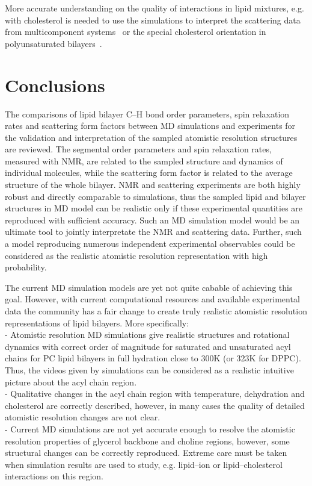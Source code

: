 \documentclass[aps,prl,superscriptaddress,twocolumn]{revtex4}
\begin{document}
More accurate understanding on the quality of interactions in lipid mixtures, e.g. with cholesterol is needed 
to use the simulations to interpret the scattering data from multicomponent systems~\cite{heftberger15} or the special
cholesterol orientation in polyunsaturated bilayers~\cite{harroun08,marrink08,kucerka10b}.



\section{Conclusions}

The comparisons of lipid bilayer C--H bond order parameters, spin relaxation rates and
scattering form factors between MD simulations and experiments for the validation and 
interpretation of the sampled atomistic resolution structures are reviewed.
The segmental order parameters and spin relaxation rates, measured with NMR, 
are related to the sampled structure and dynamics of individual molecules, while the
scattering form factor is related to the average structure of the whole bilayer.
NMR and scattering experiments are both highly robust and directly comparable to simulations, 
thus the sampled lipid and bilayer structures in MD model can be realistic only if these experimental 
quantities are reproduced with sufficient accuracy. Such an MD simulation model 
would be an ultimate tool to jointly interpretate the NMR and scattering data.
Further, such a model reproducing numerous independent experimental observables
could be  considered as the realistic atomistic resolution representation with high
probability. 

The current MD simulation models are yet not quite cabable of achieving this goal.
However, with current computational resources and available experimental
data the community has a fair change to create truly realistic atomistic resolution 
representations of lipid bilayers. More specifically: \\
- Atomistic resolution MD simulations give realistic structures and rotational dynamics
with correct order of magnitude for saturated and unsaturated acyl chains for PC lipid 
bilayers in full hydration close to 300K (or 323K for DPPC). Thus, the videos given
by simulations can be considered as a realistic intuitive picture about the acyl chain region.\\
- Qualitative changes in the acyl chain region with temperature, dehydration and cholesterol are
correctly described, however, in many cases the quality of detailed atomistic resolution changes are not clear. \\
- Current MD simulations are not yet accurate enough to resolve the atomistic resolution 
properties of glycerol backbone and choline regions, however, some structural changes can be 
correctly reproduced. Extreme care must be taken when simulation results are used to study, 
e.g. lipid--ion or lipid--cholesterol interactions on this region. \\
\end{document}
